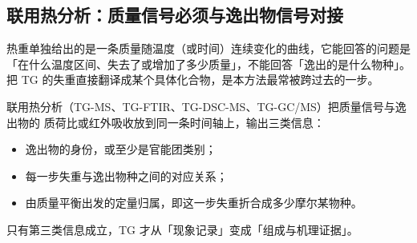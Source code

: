 
\subsection{联用热分析：质量信号必须与逸出物信号对接}

\begin{probout}
热重单独给出的是一条质量随温度（或时间）连续变化的曲线，它能回答的问题是
「在什么温度区间、失去了或增加了多少质量」，不能回答「逸出的是什么物种」。
把 TG 的失重直接翻译成某个具体化合物，是本方法最常被跨过去的一步。

联用热分析（TG-MS、TG-FTIR、TG-DSC-MS、TG-GC/MS）把质量信号与逸出物的
质荷比或红外吸收放到同一条时间轴上，输出三类信息：
\begin{itemize}
  \item 逸出物的身份，或至少是官能团类别；
  \item 每一步失重与逸出物种之间的对应关系；
  \item 由质量平衡出发的定量归属，即这一步失重折合成多少摩尔某物种。
\end{itemize}
只有第三类信息成立，TG 才从「现象记录」变成「组成与机理证据」。
\end{probout}

